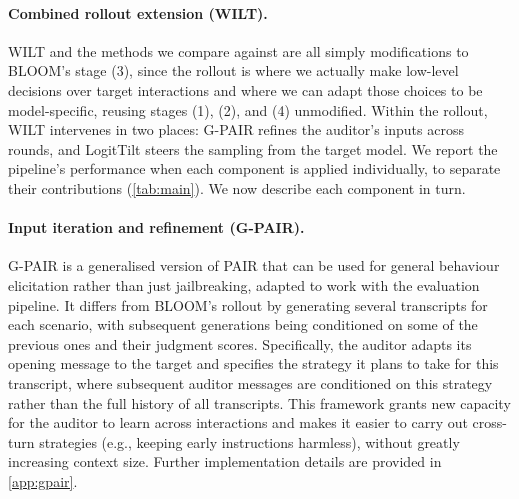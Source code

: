 \documentclass{article}
\begin{document}
\paragraph{Combined rollout extension (WILT).}
WILT and the methods we compare against are all simply modifications to BLOOM's stage (3), since the rollout is where we actually make low-level decisions over target interactions and where we can adapt those choices to be model-specific, reusing stages (1), (2), and (4) unmodified. Within the rollout, WILT intervenes in two places: G-PAIR refines the auditor's inputs across rounds, and LogitTilt steers the sampling from the target model. We report the pipeline's performance when each component is applied individually, to separate their contributions (\cref{tab:main}). We now describe each component in turn.






\paragraph{Input iteration and refinement (G-PAIR).}
G-PAIR is a generalised version of PAIR \citep{chao2023jailbreaking} that can be used for general behaviour elicitation rather than just jailbreaking, adapted to work with the evaluation pipeline. It differs from BLOOM's rollout by generating several transcripts for each scenario, with subsequent generations being conditioned on some of the previous ones and their judgment scores. Specifically, the auditor adapts its opening message to the target and specifies the strategy it plans to take for this transcript, where subsequent auditor messages are conditioned on this strategy rather than the full history of all transcripts. This framework grants new capacity for the auditor to learn across interactions and makes it easier to carry out cross-turn strategies (e.g., keeping early instructions harmless), without greatly increasing context size. Further implementation details are provided in \cref{app:gpair}.
\end{document}
